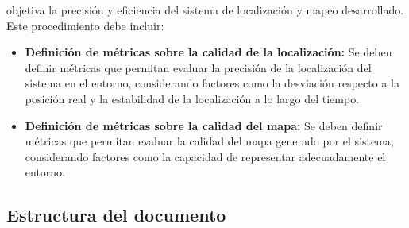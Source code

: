 \documentclass[12pt, a4paper, twoside]{article}
\begin{document}
\begin{itemize}
    objetiva la precisión y eficiencia del sistema de localización y mapeo desarrollado. Este procedimiento debe incluir:
    \begin{itemize}
    \item \textbf{Definición de métricas sobre la calidad de la localización:} Se deben definir métricas que permitan evaluar 
      la precisión de la localización del sistema en el entorno, considerando factores como la desviación respecto a la posición 
      real y la estabilidad de la localización a lo largo del tiempo.
    \item \textbf{Definición de métricas sobre la calidad del mapa:} Se deben definir métricas que permitan evaluar la calidad 
      del mapa generado por el sistema, considerando factores como la capacidad de representar adecuadamente el entorno.
    \end{itemize}
\end{itemize}

\subsection{Estructura del documento}
\end{document}
